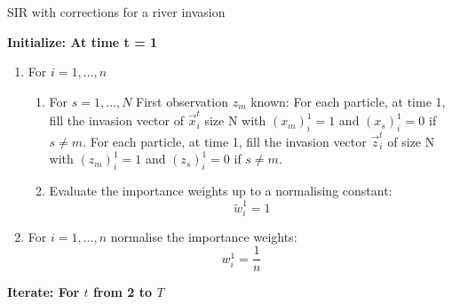 \begin{algorithm}[H]
\caption{SIR with corrections for a river invasion}\label{euclid}
 \begin{algorithmic}

 \State  \bf{Initialize:} \normalfont At time t = 1
            
\begin{enumerate}
	\item For $i = 1, \dots , n$
	\begin{enumerate}
	    \item For $s = 1, \dots, N$
		First observation $z_m$ known: For each particle, at time 1, fill the invasion vector of $\vec{x}_i^t$ size N with $(x_{m})^1_i = 1$ and $(x_{s})^1_i = 0$ if $s \neq m$. 
		For each particle, at time 1, fill the invasion vector $\vec{z}_i^t$ of size N with $(z_m)^1_i = 1$ and $(z_{s})^1_i = 0$ if $s \neq m$.
		\item Evaluate the importance weights up to a normalising constant:
		\[
		\tilde{w}^{1}_{i} = 1
		\]
	\end{enumerate}
	\item For $i = 1, \dots , n$ normalise the importance weights: 
	\[
	w^{1}_{i} = \frac{1}{n}
	\]
\end{enumerate}

 \State  \bf{Iterate:} \normalfont For $t$ from 2 to $T$


\end{algorithmic}
\end{algorithm}

